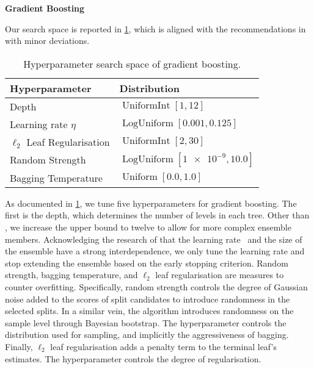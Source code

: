 \textbf{Gradient Boosting}

Our search space is reported in \cref{tab:hyperparameter-space-gbm}, which is aligned with the recommendations in \textcites[][20]{prokhorenkovaCatBoostUnbiasedBoosting2018}[][18]{gorishniyRevisitingDeepLearning2021}[][4]{rubachevRevisitingPretrainingObjectives2022} with minor deviations.

\begin{table}[H]
    \centering
    \caption[Hyperparameter Search Space of Gradient Boosting]{Hyperparameter search space of gradient boosting.}
    \label{tab:hyperparameter-space-gbm}
    \begin{tabular}{@{}ll@{}}
        \toprule
        Hyperparameter               & Distribution                                  \\ \midrule
        Depth                        & $\operatorname{UniformInt}[1,12]$             \\
        Learning rate $\eta$         & $\operatorname{LogUniform}[0.001, 0.125]$     \\
        $\ell_2$ Leaf Regularisation & $\operatorname{UniformInt}[2, 30]$            \\
        Random Strength              & $\operatorname{LogUniform}[\num{1e-9}, 10.0]$ \\
        Bagging Temperature          & $\operatorname{Uniform}[0.0, 1.0]$            \\ \bottomrule
    \end{tabular}
\end{table}

As documented in \cref{tab:hyperparameter-space-gbm}, we tune five hyperparameters for gradient boosting. The first is the depth, which determines the number of levels in each tree. Other than \textcite[][]{gorishniyRevisitingDeepLearning2021}, we increase the upper bound to twelve to allow for more complex ensemble members. Acknowledging the research of \textcite[][14]{friedmanGreedyFunctionApproximation2001} that the learning rate \eta~and the size of the ensemble have a strong interdependence, we only tune the learning rate and stop extending the ensemble based on the early stopping criterion. Random strength, bagging temperature, and $\ell_2$ leaf regularisation are measures to counter overfitting. Specifically, random strength controls the degree of Gaussian noise added to the scores of split candidates to introduce randomness in the selected splits. In a similar vein, the algorithm introduces randomness on the sample level through Bayesian bootstrap. The hyperparameter controls the distribution used for sampling, and implicitly the aggressiveness of bagging. Finally, $\ell_2$ leaf regularisation adds a penalty term to the terminal leaf's estimates. The hyperparameter controls the degree of regularisation.

